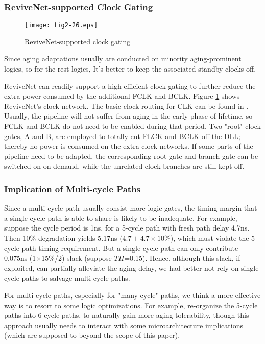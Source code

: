 \subsubsection{ReviveNet-supported Clock Gating}\label{section_clockgate}
\begin{figure}[t]
\centering
\texttt{[image: fig2-26.eps]}%
   \caption{ReviveNet-supported clock gating}\label{clkgate}
\end{figure}

Since aging adaptations usually are conducted on minority aging-prominent logics, so for the rest logics, It's better to keep the associated standby clocks off.

ReviveNet can readily support a high-efficient clock gating to further reduce the extra power consumed by the additional FCLK and BCLK. Figure \ref{clkgate} shows ReviveNet's clock network. The basic clock routing for CLK can be found in \cite{clockpower_02}. Usually, the pipeline will not suffer from aging in the early phase of lifetime, so FCLK and BCLK do not need to be enabled during that period. Two "root" clock gates, A and B, are employed to totally cut FLCK and BCLK off the DLL; thereby no power is consumed on the extra clock networks. If some parts of the pipeline need to be adapted, the corresponding root gate and branch gate can be switched on on-demand, while the unrelated clock branches are still kept off.

\subsubsection{Implication of Multi-cycle Paths}
Since a multi-cycle path usually consist more logic gates, the timing margin that a single-cycle path is able to share is likely to be inadequate. For example, suppose the cycle period is 1ns, for a 5-cycle path with fresh path delay 4.7ns. Then 10\% degradation yields 5.17ns ($4.7+4.7\times10\%$), which must violate the 5-cycle path timing requirement. But a single-cycle path can only contribute 0.075ns (1$\times$15\%/2) slack (suppose $TH$=0.15). Hence, although this slack, if exploited, can partially alleviate the aging delay, we had better not rely on single-cycle paths to salvage multi-cycle paths.

For multi-cycle paths, especially for "many-cycle" paths, we think a more effective way is to resort to some logic optimizations. For example, re-organize the 5-cycle paths into 6-cycle paths, to naturally gain more aging tolerability, though this approach usually needs to interact with some microarchitecture implications (which are supposed to beyond the scope of this paper).

